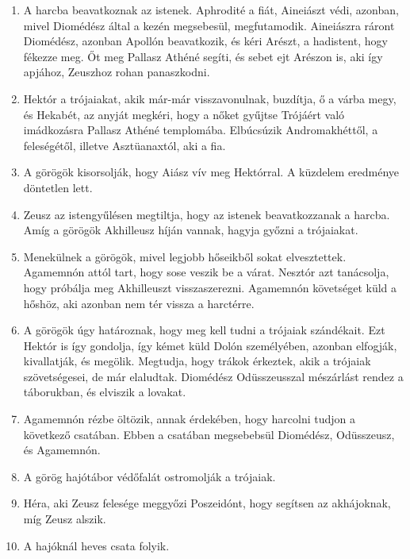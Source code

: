 \documentclass[]{article}
\begin{document}
\begin{enumerate}
				\item A harcba beavatkoznak az istenek. Aphrodité a fiát, Aineiászt védi, azonban, mivel Diomédész által a kezén megsebesül, megfutamodik. Aineiászra ráront Diomédész, azonban Apollón beavatkozik, és kéri Arészt, a hadistent, hogy fékezze meg. Őt meg Pallasz Athéné segíti, és sebet ejt Arészon is, aki így apjához, Zeuszhoz rohan panaszkodni.
				
				\item Hektór a trójaiakat, akik már-már visszavonulnak, buzdítja, ő a várba megy, és Hekabét, az anyját megkéri, hogy a nőket gyűjtse Trójáért való imádkozásra Pallasz Athéné templomába. Elbúcsúzik Andromakhéttől, a feleségétől, illetve Asztüanaxtól, aki a fia.
				
				\item A görögök kisorsolják, hogy Aiász vív meg Hektórral. A küzdelem eredménye döntetlen lett. 
				
				\item Zeusz az istengyűlésen megtiltja, hogy az istenek beavatkozzanak a harcba. Amíg a görögök Akhilleusz híján vannak, hagyja győzni a trójaiakat.
				
				\item Menekülnek a görögök, mivel legjobb hőseikből sokat elvesztettek. Agamemnón attól tart, hogy sose veszik be a várat. Nesztór azt tanácsolja, hogy próbálja meg Akhilleuszt visszaszerezni. Agamemnón követséget küld a hőshöz, aki azonban nem tér vissza a harctérre.
				
				\item A görögök úgy határoznak, hogy meg kell tudni a trójaiak szándékait. Ezt Hektór is így gondolja, így kémet küld Dolón személyében, azonban elfogják, kivallatják, és megölik. Megtudja, hogy trákok érkeztek, akik a trójaiak szövetségesei, de már elaludtak. Diomédész Odüsszeusszal mészárlást rendez a táborukban, és elviszik a lovakat.
				
				\item Agamemnón rézbe öltözik, annak érdekében, hogy harcolni tudjon a következő csatában. Ebben a csatában megsebebsül Diomédész, Odüsszeusz, és Agamemnón.
				
				\item A görög hajótábor védőfalát ostromolják a trójaiak.
				
				\item Héra, aki Zeusz felesége meggyőzi Poszeidónt, hogy segítsen az akhájoknak, míg Zeusz alszik.
				
				\item A hajóknál heves csata folyik.
				

\end{enumerate}
\end{document}
